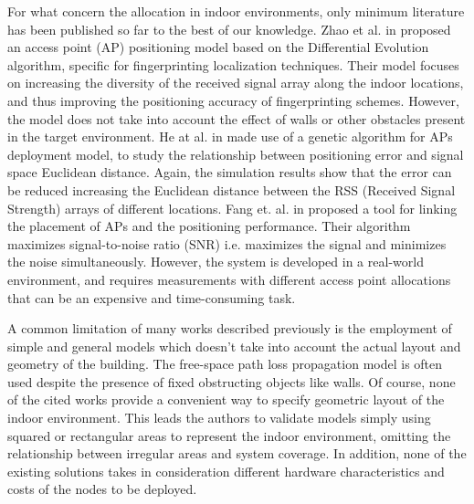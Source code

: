 For what concern the allocation in indoor environments, only minimum literature has been published so far to the best of our knowledge. Zhao et al. in \cite{Zhao2008} proposed an access point (AP) positioning model based on the Differential Evolution algorithm, specific for fingerprinting localization techniques. Their model focuses on increasing the diversity of the received signal array along the indoor locations, and thus improving the positioning accuracy of fingerprinting schemes.
However, the model does not take into account the effect of walls or other obstacles present in the target environment.
He at al. in \cite{He2011} made use of a genetic algorithm for APs deployment model, to study the relationship between positioning error and signal space Euclidean distance. Again, the simulation results show that the error can be reduced increasing the Euclidean distance between the RSS (Received Signal Strength) arrays of different locations.
Fang et. al. in \cite{Fang2010} proposed a tool for linking the placement of APs and the positioning performance. Their algorithm maximizes signal-to-noise ratio (SNR) i.e. maximizes the signal and minimizes the noise simultaneously. However, the system is developed in a real-world environment, and requires measurements with different access point allocations that can be an expensive and time-consuming task.

A common limitation of many works described previously is the employment of simple and general models which doesn't take into account the actual layout and geometry of the building. The free-space path loss propagation model is often used despite the presence of fixed obstructing objects like walls. Of course, none of the cited works provide a convenient way to specify geometric layout of the indoor environment. This leads the authors to validate models simply using squared or rectangular areas to represent the indoor environment, omitting the relationship between irregular areas and system coverage.
In addition, none of the existing solutions takes in consideration different hardware characteristics and costs of the nodes to be deployed.


